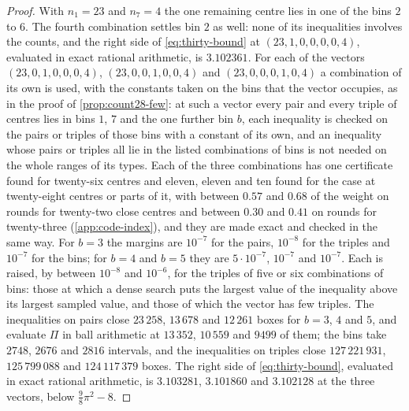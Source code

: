 \documentclass[11pt,reqno]{amsart}
\renewcommand{\_}{\origunderscore\allowbreak}
\numberwithin{equation}{section}
\theoremstyle{plain}
\theoremstyle{definition}
\theoremstyle{remark}
\begin{document}
\begin{proof}
With $n_1=23$ and $n_7=4$ the one remaining centre lies in one of the bins
$2$ to $6$. The fourth combination settles bin $2$ as well: none of
its inequalities involves the counts, and the right side of
\eqref{eq:thirty-bound} at $(23,1,0,0,0,0,4)$, evaluated in exact rational
arithmetic, is $3.102361$. For each of the vectors $(23,0,1,0,0,0,4)$,
$(23,0,0,1,0,0,4)$ and $(23,0,0,0,1,0,4)$ a combination of its own is used,
with the constants taken on the bins that the vector occupies, as in the
proof of \cref{prop:count28-few}: at such a vector every pair and every
triple of centres lies in bins $1$, $7$ and the one further bin $b$, each
inequality is checked on the pairs or triples of those bins with a constant
of its own, and an inequality whose pairs or triples all lie in the listed
combinations of bins is not needed on the whole ranges of its types. Each
of the three combinations has one certificate found for twenty-six centres
and eleven, eleven and ten found for the case at twenty-eight centres or
parts of it, with between $0.57$ and $0.68$ of the weight on rounds for
twenty-two close centres and between $0.30$ and $0.41$ on rounds for
twenty-three (\cref{app:code-index}), and they are made exact and checked in
the same way. For $b=3$ the margins are $10^{-7}$ for the pairs, $10^{-8}$
for the triples and $10^{-7}$ for the bins; for $b=4$ and $b=5$ they are
$5\cdot10^{-7}$, $10^{-7}$ and $10^{-7}$. Each is raised, by between
$10^{-8}$ and $10^{-6}$, for the triples of five or six combinations of bins:
those at which a dense search puts the largest value of the inequality above
its largest sampled value, and those of which the vector has few triples.
The inequalities on pairs close $23\,258$, $13\,678$ and $12\,261$ boxes for
$b=3$, $4$ and $5$, and evaluate $\Pi$ in ball arithmetic at $13\,352$,
$10\,559$ and $9499$ of them; the bins take $2748$, $2676$ and $2816$
intervals, and the inequalities on triples close $127\,221\,931$,
$125\,799\,088$ and $124\,117\,379$ boxes. The right side of
\eqref{eq:thirty-bound}, evaluated in exact rational arithmetic, is
$3.103281$, $3.101860$ and $3.102128$ at the three vectors, below
$\frac98\pi^2-8$.


\end{proof}
\end{document}
